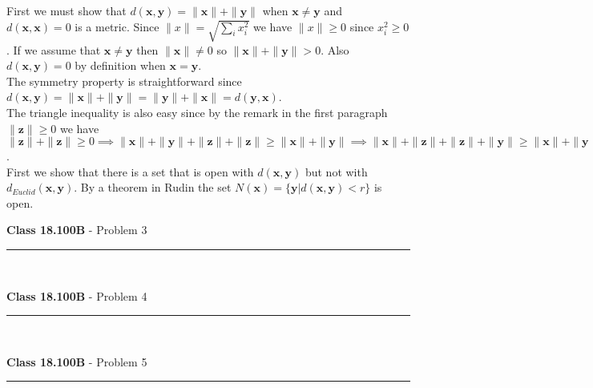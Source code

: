 \documentclass[11pt,reqno]{article}
\begin{document}
First we must show that $d(\mathbf{x},\mathbf{y}) = \| \mathbf{x} \| + \| \mathbf{y} \|$ when $\mathbf{x} \neq \mathbf{y}$ and $d(\mathbf{x},\mathbf{x}) = 0$ is a metric. Since $\|x\| = \sqrt{\sum_i x_i^2}$ we have $\| x \| \ge 0$ since $x_i^2 \ge 0$. If we assume that $\mathbf{x} \neq \mathbf{y}$ then $\|\mathbf{x}\| \neq 0$ so  $\| \mathbf{x} \| + \|  \mathbf{y} \| > 0$. Also $d(\mathbf{x},\mathbf{y}) = 0$ by definition when $\mathbf{x} = \mathbf{y}$.\\
\indent The symmetry property is straightforward since $d(\mathbf{x},\mathbf{y})  =  \| \mathbf{x} \| + \| \mathbf{y} \| =  \| \mathbf{y} \| + \| \mathbf{x} \|  = d(\mathbf{y},\mathbf{x})$.\\
\indent The triangle inequality is also easy since by the remark in the first paragraph $\| \mathbf{z} \| \ge 0$ we have $\| \mathbf{z} \| + \| \mathbf{z} \| \ge 0 \implies \| \mathbf{x} \|  + \| \mathbf{y} \| +  \| \mathbf{z} \| + \| \mathbf{z} \| \ge \|  \mathbf{x} \|  + \| \mathbf{y} \|\implies \| \mathbf{x} \|  + \| \mathbf{z} \| +  \| \mathbf{z} \| + \| \mathbf{y} \| \ge \| \mathbf{x} \|  + \| \mathbf{y} \| \implies d(\mathbf{x},\mathbf{y}) \le d(\mathbf{x},\mathbf{z}) + d(\mathbf{z},\mathbf{x})$.\\
\indent First we show that there is a set that is open with $d(\mathbf{x},\mathbf{y})$ but not with $d_{Euclid}(\mathbf{x},\mathbf{y})$. By a theorem in Rudin the set $N(\mathbf{x}) = \{ \mathbf{y} | d(\mathbf{x},\mathbf{y}) < r \}$ is open.

\vspace{15pt}
\begin{flushleft} 
\textbf{Class 18.100B} - Problem 3\\
\rule{500pt}{1pt}\\
\end{flushleft} 

\vspace{15pt}
\begin{flushleft} 
\textbf{Class 18.100B} - Problem 4\\
\rule{500pt}{1pt}\\
\end{flushleft} 

\vspace{15pt}
\begin{flushleft} 
\textbf{Class 18.100B} - Problem 5\\
\rule{500pt}{1pt}\\
\end{flushleft} 
\end{document}
